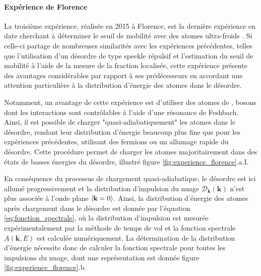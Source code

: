 \paragraph*{Expérience de Florence}
La troisième expérience, réalisée en 2015 à Florence, est la dernière expérience en date cherchant à déterminer le seuil de mobilité avec des atomes ultra-froids \citep{semeghini2015measurement}. Si celle-ci partage de nombreuses similarités avec les expériences précédentes, telles que l'utilisation d'un désordre de type speckle répulsif et l'estimation du seuil de mobilité à l'aide de la mesure de la fraction localisée, cette expérience présente des avantages considérables par rapport à ses prédécesseurs en accordant une attention particulière à la distribution d'énergie des atomes dans le désordre. 

Notamment, un avantage de cette expérience est d'utiliser des atomes de , bosons dont les interactions sont contrôlables à l'aide d'une résonance de Feshbach. Ainsi, il est possible de charger "quasi-adiabatiquement" les atomes dans le désordre, rendant leur distribution d'énergie beaucoup plus fine que pour les expériences précédentes, utilisant des fermions ou un allumage rapide du désordre. Cette procédure permet de charger les atomes majoritairement dans des états de basses énergies du désordre, illustré figure \ref{fig:experience_florence}.a.I.

En conséquence du processus de chargement quasi-adiabatique, le désordre est ici allumé progressivement et la distribution d'impulsion du nuage $\mathcal{D}_{\mathbf{k}}(\mathbf{k})$ n'est plus associée à l'onde plane $\left| \mathbf{k}=0 \right\rangle$. Ainsi, la distribution d'énergie des atomes après chargement dans le désordre est donnée par l'équation \ref{eq:fonction_spectrale}, où la distribution d'impulsion est mesurée expérimentalement par la méthode de temps de vol et la fonction spectrale $A(\mathbf{k},E)$ est calculée numériquement. La détermination de la distribution d'énergie nécessite donc de calculer la fonction spectrale pour toutes les impulsions du nuage, dont une représentation est donnée figure \ref{fig:experience_florence}.b.

